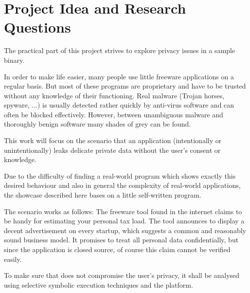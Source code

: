 \section{Project Idea and Research Questions}\label{sec:proj}

The practical part of this project strives to explore privacy issues in a sample binary.

In order to make life easier, many people use little freeware applications on a regular basis.
But most of these programs are proprietary and have to be trusted without any knowledge of their functioning.
Real malware (Trojan horses, spyware, ...) is usually detected rather quickly by anti-virus software and can often be blocked effectively.
However, between unambiguous malware and thoroughly benign software many shades of grey can be found.

This work will focus on the scenario that an application (intentionally or unintentionally) leaks delicate private data without the user's consent or knowledge.


Due to the difficulty of finding a real-world program which shows exactly this desired behaviour and also in general the complexity of real-world applications, the showcase described here bases on a little self-written program.

The scenario works as follows: The freeware tool \app found in the internet claims to be handy for estimating your personal tax load.
The tool announces to display a decent advertisement on every startup, which suggests a common and reasonably sound business model.
It promises to treat all personal data confidentially, but since the application is closed source, of course this claim cannot be verified easily.

To make sure that \app does not compromise the user's privacy, it shall be analysed using selective symbolic execution techniques and the \sse platform.

